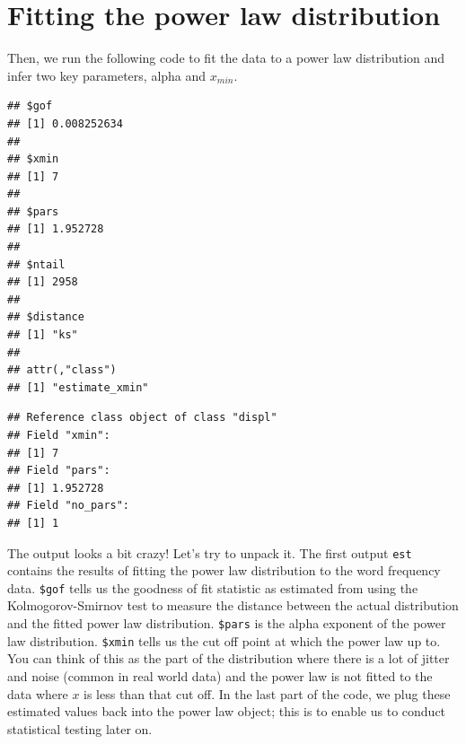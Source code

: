 \documentclass[
]{book}
\newenvironment{Shaded}{\begin{snugshade}}{\end{snugshade}}
\newcommand{\CommentTok}[1]{\textcolor[rgb]{0.56,0.35,0.01}{\textit{#1}}}
\newcommand{\FunctionTok}[1]{\textcolor[rgb]{0.13,0.29,0.53}{\textbf{#1}}}
\newcommand{\NormalTok}[1]{#1}
\newcommand{\OtherTok}[1]{\textcolor[rgb]{0.56,0.35,0.01}{#1}}
\newcommand{\SpecialCharTok}[1]{\textcolor[rgb]{0.81,0.36,0.00}{\textbf{#1}}}
\begin{document}
\section{Fitting the power law distribution}\label{fitting-the-power-law-distribution}

Then, we run the following code to fit the data to a power law distribution and infer two key parameters, alpha and \(x_{min}\).

\begin{Shaded}
\end{Shaded}

\begin{verbatim}
## $gof
## [1] 0.008252634
## 
## $xmin
## [1] 7
## 
## $pars
## [1] 1.952728
## 
## $ntail
## [1] 2958
## 
## $distance
## [1] "ks"
## 
## attr(,"class")
## [1] "estimate_xmin"
\end{verbatim}

\begin{Shaded}
\end{Shaded}

\begin{verbatim}
## Reference class object of class "displ" 
## Field "xmin": 
## [1] 7
## Field "pars": 
## [1] 1.952728
## Field "no_pars": 
## [1] 1
\end{verbatim}

The output looks a bit crazy! Let's try to unpack it. The first output \texttt{est} contains the results of fitting the power law distribution to the word frequency data. \texttt{\$gof} tells us the goodness of fit statistic as estimated from using the Kolmogorov-Smirnov test to measure the distance between the actual distribution and the fitted power law distribution. \texttt{\$pars} is the alpha exponent of the power law distribution. \texttt{\$xmin} tells us the cut off point at which the power law up to. You can think of this as the part of the distribution where there is a lot of jitter and noise (common in real world data) and the power law is not fitted to the data where \(x\) is less than that cut off. In the last part of the code, we plug these estimated values back into the power law object; this is to enable us to conduct statistical testing later on.
\end{document}
